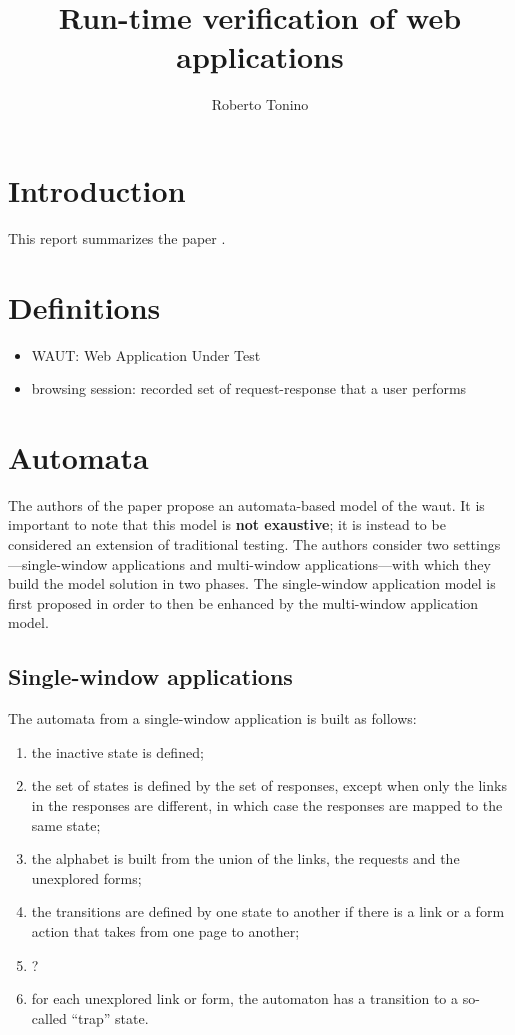 \documentclass[a4paper,10pt]{article}
\title{Run-time verification of web applications}
\author{Roberto Tonino}
\theoremstyle{plain} %
\theoremstyle{definition}
\theoremstyle{remark}
\begin{document}
\maketitle

\tableofcontents

\clearpage

\section{Introduction}

This report summarizes the paper .

\section{Definitions}

\begin{itemize}
  \item WAUT: Web Application Under Test
  \item browsing session: recorded set of request-response that a user performs
\end{itemize}

\section{Automata}

The authors of the paper propose an automata-based model of the \gls{waut}. It is important to note that this model is \textbf{not exaustive}; it is instead to be considered an extension of traditional testing. The authors consider two settings---single-window applications and multi-window applications---with which they build the model solution in two phases. The single-window application model is first proposed in order to then be enhanced by the multi-window application model.

\subsection{Single-window applications}
\label{single-window-applications}

The automata from a single-window application is built as follows:

\begin{enumerate}
  \item the inactive state is defined;
  \item the set of states is defined by the set of responses, except when only the links in the responses are different, in which case the responses are mapped to the same state;
  \item the alphabet is built from the union of the links, the requests and the unexplored forms;
  \item the transitions are defined by one state to another if there is a link or a form action that takes from one page to another;
  \item ?
  \item for each unexplored link or form, the automaton has a transition to a so-called ``trap'' state.
\end{enumerate}
\end{document}
